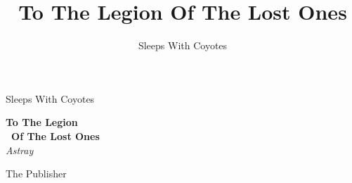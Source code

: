 \documentclass[halfletter,14pt,oneside,onecolumn,openleft]{memoir}
\title{To The Legion Of The Lost Ones}
\author{Sleeps With Coyotes}
\date{}
\newcommand*{\plogo}{\fbox{$\mathcal{PL}$}} %
\begin{document}
\frontmatter
\begin{titlingpage}

  \raggedleft %
  
  \vspace*{\baselineskip} %
  
  
  {\Large Sleeps With Coyotes} %
  
  \vspace*{0.167\textheight} %
  
  
  \textbf{\LARGE To The Legion}\\[\baselineskip] %
  
  \textbf{\LARGE ~Of The Lost Ones}\\[\baselineskip] %
  
  {\Large \textit{Astray}} %
  
  \vfill %
  
  
  {\large The Publisher~~\plogo} %
  
  \vspace*{3\baselineskip} %


\end{titlingpage}
\cleardoublepage
\cleardoublepage
\mainmatter




\backmatter
\end{document}
